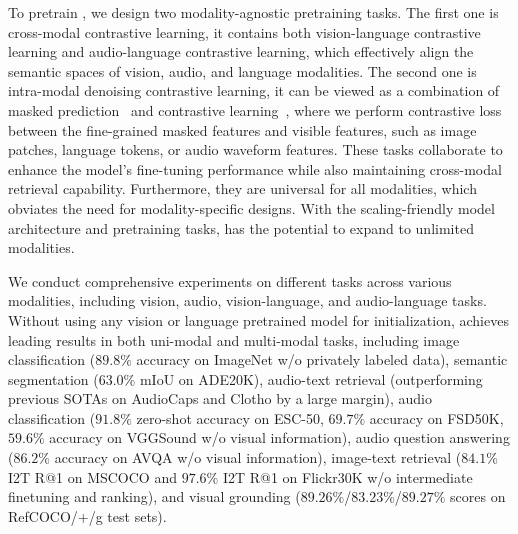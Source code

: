 To pretrain \onepeace, we design two modality-agnostic pretraining tasks.
The first one is cross-modal contrastive learning, it contains both vision-language contrastive learning and audio-language contrastive learning, which effectively align the semantic spaces of vision, audio, and language modalities.
The second one is intra-modal denoising contrastive learning, it can be viewed as a combination of masked prediction~\cite{bert,beit,mae,wav2vec} and contrastive learning~\cite{clip,simclr,moco}, where we perform contrastive loss between the fine-grained masked features and visible features, such as image patches, language tokens, or audio waveform features.
These tasks collaborate to enhance the model's fine-tuning performance while also maintaining cross-modal retrieval capability.
Furthermore, they are universal for all modalities, which obviates the need for modality-specific designs.
With the scaling-friendly model architecture and pretraining tasks, \onepeace has the potential to expand to unlimited modalities.

We conduct comprehensive experiments on different tasks across various modalities, including vision, audio, vision-language, and audio-language tasks.
Without using any vision or language pretrained model for initialization, \onepeace achieves leading results in both uni-modal and multi-modal tasks, including image classification ($89.8\%$ accuracy on ImageNet w/o privately labeled data), semantic segmentation ($63.0\%$ mIoU on ADE20K), audio-text retrieval (outperforming previous SOTAs on AudioCaps and Clotho by a large margin), audio classification ($91.8\%$ zero-shot accuracy on ESC-50, $69.7\%$ accuracy on FSD50K, $59.6\%$ accuracy on VGGSound w/o visual information), audio question answering ($86.2\%$ accuracy on AVQA w/o visual information), image-text retrieval ($84.1\%$ I2T R@1 on MSCOCO and $97.6\%$ I2T R@1 on Flickr30K w/o intermediate finetuning and ranking), and visual grounding ($89.26\%$/$83.23\%$/$89.27\%$ scores on RefCOCO/+/g test sets).


